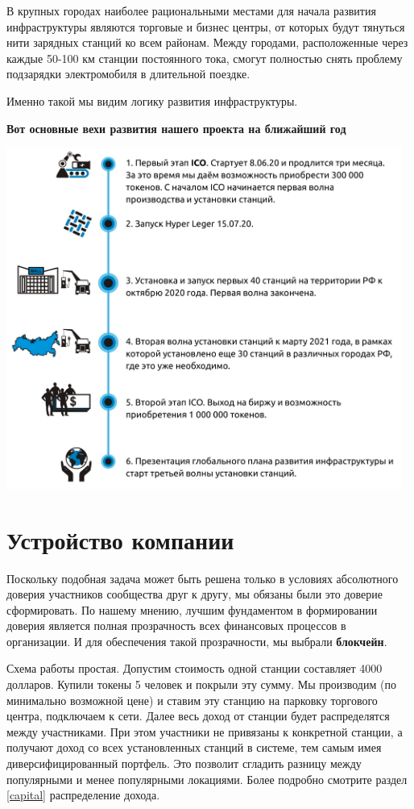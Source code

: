 \documentclass[a4paper,12pt]{report}
\begin{document}
В крупных городах наиболее рациональными местами для начала развития инфраструктуры являются торговые и бизнес центры, от которых будут тянуться нити зарядных станций ко всем районам. Между городами, расположенные через каждые 50-100 км станции постоянного тока, смогут полностью снять проблему подзарядки электромобиля в длительной поездке. 

Именно такой мы видим логику развития инфраструктуры.


\begin{center}
	\textbf{Вот основные вехи развития нашего проекта на ближайший год}
\end{center}

\includegraphics[width=13cm]{roadmap2}
\vspace*{1cm}

\chapter{Устройство компании}
Поскольку подобная задача может быть решена только в условиях абсолютного доверия участников сообщества друг к другу, мы обязаны были это доверие сформировать. По нашему мнению, лучшим фундаментом в формировании доверия является полная прозрачность всех финансовых процессов в организации. И для обеспечения такой прозрачности, мы выбрали \textbf{блокчейн}. 

Схема работы простая. Допустим стоимость одной станции составляет 4000 долларов. Купили токены 5 человек и покрыли эту сумму. Мы производим (по минимально возможной цене) и ставим эту станцию на парковку торгового центра, подключаем к сети. 
Далее весь доход от станции будет распределятся между участниками. При этом участники не привязаны к конкретной станции, а получают доход со всех установленных станций в системе, тем самым имея диверсифицированный портфель. Это позволит сгладить разницу между популярными и менее популярными локациями. 
Более подробно смотрите раздел \ref{capital} распределение дохода.
\end{document}
